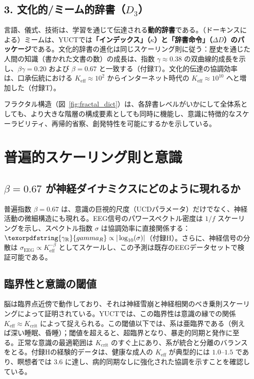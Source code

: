 \documentclass[12pt,a4paper]{article}
\DeclareRobustCommand{\gaR}{\texorpdfstring{\ensuremath{\gamma_{\mathrm{R}}}}{gamma_R}}
\newcommand{\eff}{\mathrm{eff}}
\newcommand{\Ke}{K_{\eff}}
\newcommand{\Kcrit}{K_{\mathrm{crit}}}
\begin{document}
	\subsection{3. 文化的/ミーム的辞書（\(D_3\)）}
	
	言語、儀式、技術は、学習を通じて伝達される\textbf{動的辞書}である。（ドーキンスによる）ミームは、YUCTでは\textbf{「インデックス」（\(\kappa\)）と「辞書命令」（\(\Delta D\)）のパッケージ}である。文化的辞書の進化は同じスケーリング則に従う：歴史を通じた人間の知識（書かれた文書の数）の成長は、指数 \(\gamma \approx 0.38\) の双曲線的成長を示し、\(\beta\gamma = 0.20\) および \(\beta = 0.67\) と一致する（付録T）。文化的伝達の協調効率は、口承伝統における \(\Ke \approx 10^2\) からインターネット時代の \(\Ke \approx 10^{10}\) へと増加した（付録T）。
	
	フラクタル構造（図~\ref{fig:fractal_dict}）は、各辞書レベルがいかにして全体系としても、より大きな階層の構成要素としても同時に機能し、意識に特徴的なスケーラビリティ、再帰的省察、創発特性を可能にするかを示している。
	
	\section{普遍的スケーリング則と意識}
	
	\subsection{\(\beta = 0.67\) が神経ダイナミクスにどのように現れるか}
	
	普遍指数 \(\beta = 0.67\) は、意識の巨視的尺度（UCDパラメータ）だけでなく、神経活動の微細構造にも現れる。EEG信号のパワースペクトル密度は \(1/f\) スケーリングを示し、スペクトル指数 \(\sigma\) は協調効率に直接関係する：\(\gaR \propto |\log_{10}(\sigma)|\)（付録H）。さらに、神経信号の分散は \(\sigma_{\text{EEG}} \propto \Ke^{-\beta}\) としてスケールし、この予測は既存のEEGデータセットで検証可能である。
	
	\subsection{臨界性と意識の閾値}
	
	脳は臨界点近傍で動作しており、それは神経雪崩と神経相関のべき乗則スケーリングによって証明されている。YUCTでは、この臨界性は意識の縁での関係 \(\Ke \approx \Kcrit\) によって捉えられる。この閾値以下では、系は亜臨界である（例えば深い睡眠、昏睡）；閾値を超えると、超臨界となり、暴走的同期と発作に至る。正常な意識の最適範囲は \(\Kcrit\) のすぐ上にあり、系が統合と分離のバランスをとる。付録Hの経験的データは、健康な成人の \(\Ke\) が典型的には \(1.0\)--\(1.5\) であり、瞑想者では \(3.6\) に達し、病的同期なしに強化された協調を示すことを確認している。
	
\end{document}
